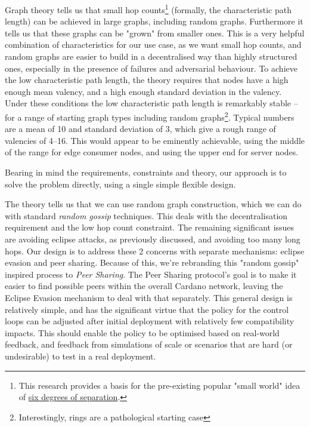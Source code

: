 \documentclass[11pt,a4paper]{article}
\begin{document}
Graph theory \cite{Watts99} tells us that small hop counts\footnote{This
  research provides a basis for the pre-existing popular "small world"
  idea of
  \href{https://en.wikipedia.org/wiki/Six_degrees_of_separation\#Computer_networks}{{six
  degrees of separation}}.} (formally, the characteristic path length)
can be achieved in large graphs, including random graphs. Furthermore it
tells us that these graphs can be "grown" from smaller ones. This is a
very helpful combination of characteristics for our use case, as we want
small hop counts, and random graphs are easier to build in a
decentralised way than highly structured ones, especially in the
presence of failures and adversarial behaviour. To achieve the low
characteristic path length, the theory requires that nodes have a high
enough mean valency, and a high enough standard deviation in the
valency. Under these conditions the low characteristic path length is
remarkably stable -- for a range of starting graph types including
random graphs\footnote{Interestingly, rings are a pathological starting
  case}. Typical numbers are a mean of 10 and standard deviation of 3,
which give a rough range of valencies of 4--16. This would appear to be
eminently achievable, using the middle of the range for edge consumer
nodes, and using the upper end for server nodes.

Bearing in mind the requirements, constraints and theory, our approach
is to solve the problem directly, using a single simple flexible design.

The theory tells us that we can use random graph construction, which we
can do with standard \emph{random gossip} techniques. This deals with
the decentralisation requirement and the low hop count constraint. The
remaining significant issues are avoiding eclipse attacks, as previously
discussed, and avoiding too many long hops. Our design is to address
these 2 concerns with separate mechanisms: eclipse evasion and peer sharing.
Because of this, we're rebranding this "random gossip" inspired process to
\emph{Peer Sharing}. The Peer Sharing protocol's goal is to make it easier
to find possible peers within the overall Cardano network, leaving the
Eclipse Evasion mechanism to deal with that separately. This general
design is relatively simple, and has the significant virtue that the
policy for the control loops can be adjusted after initial deployment
with relatively few compatibility impacts. This should enable the
policy to be optimised based on real-world feedback, and feedback
from simulations of scale or scenarios that are hard (or undesirable)
to test in a real deployment.
\end{document}
